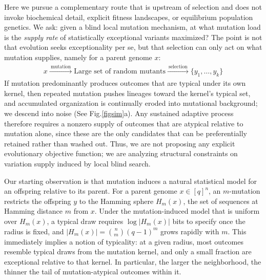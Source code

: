 \documentclass[9pt,twocolumn,oneside]{pnas-new}
\def\EQSP{2pt}
\newcommand{\cgather}[2][\EQSP]{\begingroup\setlength\abovedisplayskip{#1}\setlength\belowdisplayskip{#1}\begin{gather} #2 \end{gather}\endgroup\noindent}
\begin{document}
Here we pursue a complementary route that is upstream of selection and does not invoke biochemical detail, explicit fitness landscapes, or equilibrium population genetics. We ask: given a blind local mutation mechanism, at what mutation load is the \emph{supply rate} of statistically exceptional variants maximized? The point is not that evolution seeks exceptionality per se, but that selection can only act on what mutation supplies, namely for a parent genome $x$:
\cgather{x \xrightarrow{\ \textrm{mutation}\ } \textrm{Large set of random mutants}
    \xrightarrow{\ \textrm{selection}\ } \{y_1,\dots,y_k\}}
If mutation predominantly produces outcomes that are typical under its own kernel, then repeated mutation pushes lineages toward the kernel's typical set, and accumulated organization is continually eroded into mutational background; we descend into noise (See Fig.\ref{figsim}a). Any sustained adaptive process therefore requires a nonzero supply of outcomes that are atypical relative to mutation alone, since these are the only candidates that can be preferentially retained rather than washed out. Thus, we are not proposing any explicit evolutionary objective function; we are analyzing  structural constraints on variation supply induced by local blind search.

Our starting observation is that mutation induces a natural statistical model for an offspring relative to its parent. For a parent genome $x\in[q]^n$, an $m$-mutation restricts the offspring $y$ to the Hamming sphere $H_m(x)$, the set of sequences at Hamming distance $m$ from $x$. Under the mutation-induced model that is uniform over $H_m(x)$, a typical draw requires $\log|H_m(x)|$ bits to specify once the radius is fixed, and
$|H_m(x)|=\binom{n}{m}(q-1)^m$ grows rapidly with $m$. This immediately implies a notion of typicality: at a given radius, most outcomes resemble typical draws from the mutation kernel, and only a small fraction are exceptional relative to that kernel. In particular, the larger the neighborhood, the thinner the tail of mutation-atypical outcomes within it.
\end{document}
